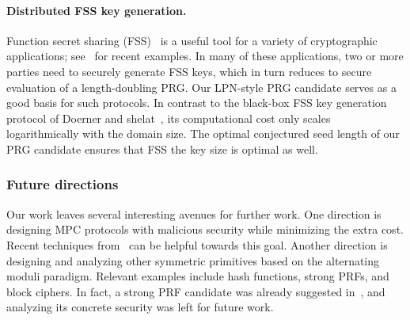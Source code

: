 \paragraph{Distributed FSS key generation.} Function secret sharing (FSS)~\cite{boyle2015-fss} is a useful tool for a variety of cryptographic applications; see~\cite{BoyleCGGIKR20,boyle2020-lpn-pcg} for recent examples. In many of these applications, two or more parties need to securely generate FSS keys, which in turn reduces to secure evaluation of a length-doubling PRG. Our LPN-style PRG candidate serves as a good basis for such protocols. In contrast to the black-box FSS key generation protocol of Doerner and shelat~\cite{DoernerS17}, its computational cost only scales logarithmically with the domain size. The optimal conjectured seed length of our PRG candidate ensures that FSS the key size is optimal as well.


\subsubsection{Future directions} Our work leaves several interesting avenues for further work. One direction is designing MPC protocols with malicious security while minimizing the extra cost. Recent techniques from~\cite{BBCGI19,BGIN19} can be helpful towards this goal. Another direction is designing and analyzing other symmetric primitives based on the alternating moduli paradigm. Relevant examples include hash functions, strong PRFs, and block ciphers.
In fact, a strong PRF candidate was already suggested in~\cite{boneh2018-darkmatter}, and analyzing its concrete security was left for future work.


%
